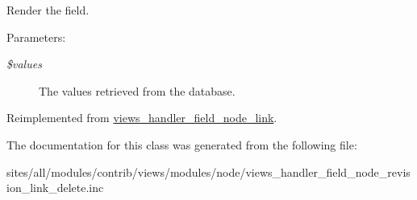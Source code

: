 Render the field.

\begin{Desc}
\item[Parameters:]
\begin{description}
\item[{\em \$values}]The values retrieved from the database. \end{description}
\end{Desc}


Reimplemented from \hyperlink{classviews__handler__field__node__link_9621ff38a6b318eb94f0c44fa2f711f5}{views\_\-handler\_\-field\_\-node\_\-link}.

The documentation for this class was generated from the following file:\begin{CompactItemize}
\item 
sites/all/modules/contrib/views/modules/node/views\_\-handler\_\-field\_\-node\_\-revision\_\-link\_\-delete.inc\end{CompactItemize}
